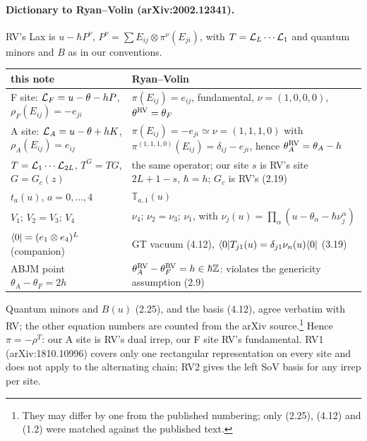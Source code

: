 \paragraph{Dictionary to Ryan--Volin (arXiv:2002.12341).} RV's Lax is $u-\hbar P^\nu$,
$P^\nu=\sum E_{ij}\otimes\pi^\nu(E_{ji})$, with $T=\mathcal L_L\cdots\mathcal L_1$ and quantum minors and $B$ as in our conventions.
\begin{center}
\small
\begin{tabular}{@{}p{}p{}@{}}
\toprule
this note & Ryan--Volin\\
\midrule
F site: $\mathcal L_F=u-\theta-hP$, $\rho_F(E_{ij})=-e_{ji}$ & $\pi(E_{ij})=e_{ij}$, fundamental, $\nu=(1,0,0,0)$, $\theta^{\rm RV}=\theta_F$\\[2pt]
A site: $\mathcal L_A=u-\theta+hK$, $\rho_A(E_{ij})=e_{ij}$ & $\pi(E_{ij})=-e_{ji}\simeq\nu=(1,1,1,0)$ with
 $\pi^{(1,1,1,0)}(E_{ij})=\delta_{ij}-e_{ji}$, hence $\theta^{\rm RV}_A=\theta_A-h$\\[2pt]
$T=\mathcal L_1\cdots\mathcal L_{2L}$, $T^G=TG$, $G=G_c(z)$ & the same operator; our site $s$ is RV's site $2L+1-s$, $\hbar=h$;
 $G_c$ is RV's (2.19)\\[2pt]
$t_a(u)$, $a=0,\dots,4$ & $\mathbb T_{a,1}(u)$\\[2pt]
$V_1$; $V_2=V_3$; $V_4$ & $\nu_4$; $\nu_2=\nu_3$; $\nu_1$, with $\nu_j(u)=\prod_\alpha(u-\theta_\alpha-\hbar\nu_j^\alpha)$\\[2pt]
$\langle0|=(e_1\otimes e_4)^L$ (companion) & GT vacuum (4.12), $\langle0|T_{j1}(u)=\delta_{j1}\nu_n(u)\langle0|$ (3.19)\\[2pt]
ABJM point $\theta_A-\theta_F=2h$ & $\theta^{\rm RV}_A-\theta^{\rm RV}_F=h\in\hbar\mathbb Z$: violates the genericity assumption (2.9)\\
\bottomrule
\end{tabular}
\end{center}
Quantum minors and $B(u)$ (2.25), and the basis (4.12), agree verbatim with RV; the other equation numbers are counted
from the arXiv source.\footnote{They may differ by one from the published numbering; only (2.25), (4.12) and (1.2)
were matched against the published text.} Hence $\pi=-\rho^T$: our A site is RV's dual irrep, our F site RV's
fundamental. RV1 (arXiv:1810.10996) covers only one rectangular representation on every site and does not apply to
the alternating chain; RV2 gives the left SoV basis for any irrep per site.

